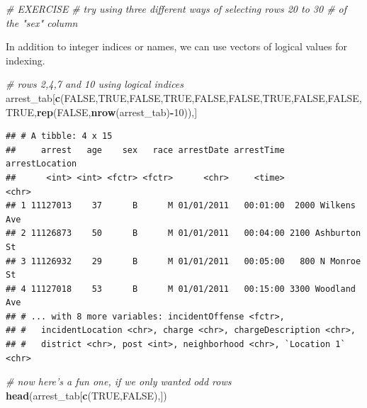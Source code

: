 \documentclass[12pt,]{book}
\newenvironment{Shaded}{\begin{snugshade}}{\end{snugshade}}
\newcommand{\KeywordTok}[1]{\textcolor[rgb]{0.13,0.29,0.53}{\textbf{#1}}}
\newcommand{\DecValTok}[1]{\textcolor[rgb]{0.00,0.00,0.81}{#1}}
\newcommand{\CommentTok}[1]{\textcolor[rgb]{0.56,0.35,0.01}{\textit{#1}}}
\newcommand{\OtherTok}[1]{\textcolor[rgb]{0.56,0.35,0.01}{#1}}
\newcommand{\OperatorTok}[1]{\textcolor[rgb]{0.81,0.36,0.00}{\textbf{#1}}}
\newcommand{\NormalTok}[1]{#1}
\theoremstyle{definition}
\theoremstyle{definition}
\theoremstyle{remark}
\begin{document}
\begin{Shaded}
\begin{Highlighting}[]
\CommentTok{# EXERCISE}
\CommentTok{# try using three different ways of selecting rows 20 to 30 # of the "sex" column}
\end{Highlighting}
\end{Shaded}

In addition to integer indices or names, we can use vectors of logical
values for indexing.

\begin{Shaded}
\begin{Highlighting}[]
\CommentTok{# rows 2,4,7 and 10 using logical indices}
\NormalTok{arrest_tab[}\KeywordTok{c}\NormalTok{(}\OtherTok{FALSE}\NormalTok{,}\OtherTok{TRUE}\NormalTok{,}\OtherTok{FALSE}\NormalTok{,}\OtherTok{TRUE}\NormalTok{,}\OtherTok{FALSE}\NormalTok{,}\OtherTok{FALSE}\NormalTok{,}\OtherTok{TRUE}\NormalTok{,}\OtherTok{FALSE}\NormalTok{,}\OtherTok{FALSE}\NormalTok{,}\OtherTok{TRUE}\NormalTok{,}\KeywordTok{rep}\NormalTok{(}\OtherTok{FALSE}\NormalTok{,}\KeywordTok{nrow}\NormalTok{(arrest_tab)}\OperatorTok{-}\DecValTok{10}\NormalTok{)),]}
\end{Highlighting}
\end{Shaded}

\begin{verbatim}
## # A tibble: 4 x 15
##     arrest   age    sex   race arrestDate arrestTime    arrestLocation
##      <int> <int> <fctr> <fctr>      <chr>     <time>             <chr>
## 1 11127013    37      B      M 01/01/2011   00:01:00  2000 Wilkens Ave
## 2 11126873    50      B      M 01/01/2011   00:04:00 2100 Ashburton St
## 3 11126932    29      B      M 01/01/2011   00:05:00   800 N Monroe St
## 4 11127018    53      B      M 01/01/2011   00:15:00 3300 Woodland Ave
## # ... with 8 more variables: incidentOffense <fctr>,
## #   incidentLocation <chr>, charge <chr>, chargeDescription <chr>,
## #   district <chr>, post <int>, neighborhood <chr>, `Location 1` <chr>
\end{verbatim}

\begin{Shaded}
\begin{Highlighting}[]
\CommentTok{# now here's a fun one, if we only wanted odd rows}
\KeywordTok{head}\NormalTok{(arrest_tab[}\KeywordTok{c}\NormalTok{(}\OtherTok{TRUE}\NormalTok{,}\OtherTok{FALSE}\NormalTok{),])}
\end{Highlighting}
\end{Shaded}
\end{document}
